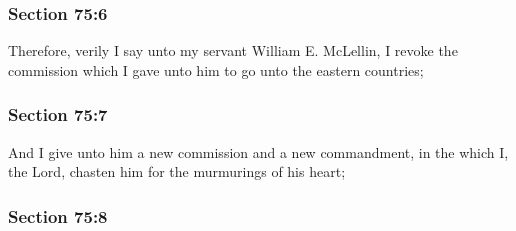 
	\subsubsection{Section 75:6} %
		\label{DC75-6}

		Therefore, verily I say unto my servant William E. McLellin, I revoke the commission which I gave unto him to go unto the eastern countries;


	\subsubsection{Section 75:7} %
		\label{DC75-7}

		And I give unto him a new commission and a new commandment, in the which I, the Lord, chasten him for the murmurings of his heart;


	\subsubsection{Section 75:8} %
		\label{DC75-8}

